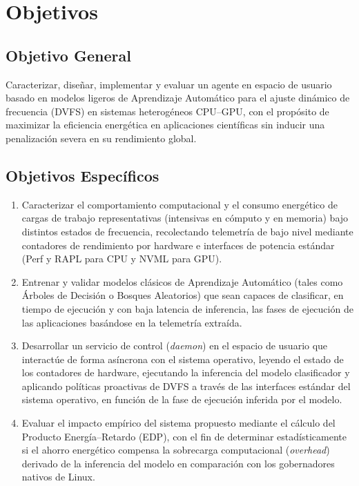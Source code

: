 
\section*{Objetivos}

\subsection*{Objetivo General}

Caracterizar, diseñar, implementar y evaluar un agente en espacio de usuario basado en modelos ligeros de Aprendizaje Automático para el ajuste dinámico de frecuencia (DVFS) en sistemas heterogéneos CPU--GPU, con el propósito de maximizar la eficiencia energética en aplicaciones científicas sin inducir una penalización severa en su rendimiento global.

\subsection*{Objetivos Específicos}

\begin{enumerate}

    \item Caracterizar el comportamiento computacional y el consumo energético de cargas de trabajo representativas (intensivas en cómputo y en memoria) bajo distintos estados de frecuencia, recolectando telemetría de bajo nivel mediante contadores de rendimiento por hardware e interfaces de potencia estándar (Perf y RAPL para CPU y NVML para GPU).

    \item Entrenar y validar modelos clásicos de Aprendizaje Automático (tales como Árboles de Decisión o Bosques Aleatorios) que sean capaces de clasificar, en tiempo de ejecución y con baja latencia de inferencia, las fases de ejecución de las aplicaciones basándose en la telemetría extraída.

    \item Desarrollar un servicio de control (\textit{daemon}) en el espacio de usuario que interactúe de forma asíncrona con el sistema operativo, leyendo el estado de los contadores de hardware, ejecutando la inferencia del modelo clasificador y aplicando políticas proactivas de DVFS a través de las interfaces estándar del sistema operativo, en función de la fase de ejecución inferida por el modelo.

    \item Evaluar el impacto empírico del sistema propuesto mediante el cálculo del Producto Energía--Retardo (EDP), con el fin de determinar estadísticamente si el ahorro energético compensa la sobrecarga computacional (\textit{overhead}) derivado de la inferencia del modelo en comparación con los gobernadores nativos de Linux.

\end{enumerate}

